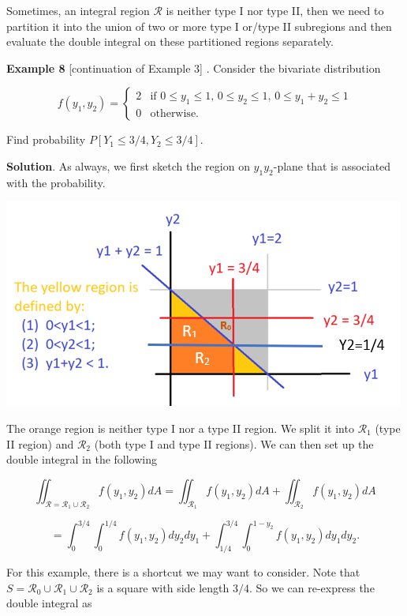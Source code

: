 \documentclass[
]{book}
\begin{document}
\hfill\break

Sometimes, an integral region \(\mathcal{R}\) is neither type I nor type II, then we need to partition it into the union of two or more type I or/type II subregions and then evaluate the double integral on these partitioned regions separately.

\hfill\break

\textbf{Example 8} {[}continuation of Example 3{]} . Consider the bivariate distribution

\[
\displaystyle f(y_1, y_2) = \begin{cases} 
 2 & \text{if $0 \le y_1 \le 1$, $0 \le y_2 \le 1$, $0 \le y_1 +y_2 \le 1$}\\  
 0 & \text{otherwise}.
 \end{cases}
\]

Find probability \(P[Y_1 \le 3/4, Y_2 \le 3/4]\).

\hfill\break

\textbf{Solution}. As always, we first sketch the region on \(y_1y_2\)-plane that is associated with the probability.

\begin{center}\includegraphics[width=0.7\linewidth]{topic06/example08IntegralRegion} \end{center}

The orange region is neither type I nor a type II region. We split it into \(\mathcal{R}_1\) (type II region) and \(\mathcal{R}_2\) (both type I and type II regions). We can then set up the double integral in the following

\[
\iint_{\mathcal{R} = \mathcal{R_1} \cup \mathcal{R_2}} f(y_1,y_2)dA = \iint_{\mathcal{R_1}} f(y_1,y_2)dA + \iint_{\mathcal{R_2}} f(y_1,y_2)dA
\]

\[
=\int_0^{3/4}\int_0^{1/4} f(y_1, y_2)  dy_2dy_1 + \int_{1/4}^{3/4}\int_0^{1-y_2} f(y_1,y_2) dy_1dy_2.
\]

For this example, there is a shortcut we may want to consider. Note that \(S = \mathcal{R_0} \cup \mathcal{R_1} \cup \mathcal{R_2}\) is a square with side length \(3/4\). So we can re-express the double integral as
\end{document}
